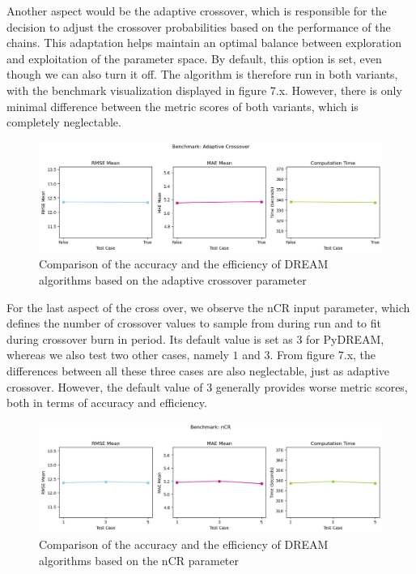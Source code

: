 Another aspect would be the adaptive crossover, which is responsible for the decision to adjust the crossover probabilities based on the performance of the chains.\cite{dream} This adaptation helps maintain an optimal balance between exploration and exploitation of the parameter space. By default, this option is set, even though we can also turn it off. The algorithm is therefore run in both variants, with the benchmark visualization displayed in figure 7.x. However, there is only minimal difference between the metric scores of both variants, which is completely neglectable. 
\begin{figure}[H]
    \centering
    \includegraphics[width=1\textwidth]{figures/dream/adaptive_crossover.png}
    \captionsetup{width=.8\textwidth}
    \caption{Comparison of the accuracy and the efficiency of DREAM algorithms based on the adaptive crossover parameter}
    \label{fig:enter-label}
\end{figure}

For the last aspect of the cross over, we observe the nCR input parameter, which defines the number of crossover values to sample from during run and to fit during crossover burn in period. Its default value is set as $3$ for PyDREAM, whereas we also test two other cases, namely $1$ and $3$. From figure 7.x, the differences between all these three cases are also neglectable, just as adaptive crossover. However, the default value of $3$ generally provides worse metric scores, both in terms of accuracy and efficiency.
\begin{figure}[H]
    \centering
    \includegraphics[width=1\textwidth]{figures/dream/nCR.png}
    \captionsetup{width=.8\textwidth}
    \caption{Comparison of the accuracy and the efficiency of DREAM algorithms based on the nCR parameter}
    \label{fig:enter-label}
\end{figure}

